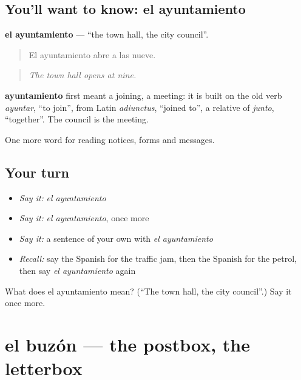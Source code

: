 \subsection*{You'll want to know: el ayuntamiento}
\textbf{el ayuntamiento} — \textquotedblleft{}the town hall, the city council\textquotedblright{}.

\begin{quote}
El ayuntamiento abre a las nueve.
\end{quote}

\begin{quote}
\emph{The town hall opens at nine.}
\end{quote}

\begin{cousinweb}
\textbf{ayuntamiento} first meant a joining, a meeting: it is built on the old verb \emph{ayuntar}, \textquotedblleft{}to join\textquotedblright{}, from Latin \emph{adiunctus}, \textquotedblleft{}joined to\textquotedblright{}, a relative of \emph{junto}, \textquotedblleft{}together\textquotedblright{}. The council is the meeting.
\end{cousinweb}

\begin{grammarlens}[title={What you've built}]
One more word for reading notices, forms and messages.
\end{grammarlens}

\subsection*{Your turn}
\begin{itemize}
\raggedright
  \item \emph{Say it:} \emph{el ayuntamiento}
  \item \emph{Say it:} \emph{el ayuntamiento}, once more
  \item \emph{Say it:} a sentence of your own with \emph{el ayuntamiento}
  \item \emph{Recall:} say the Spanish for the traffic jam, then the Spanish for the petrol, then say \emph{el ayuntamiento} again
\end{itemize}

\begin{tcolorbox}[breakable,colback=teal!4,colframe=teal!35!black,title={Before you move on}]
What does el ayuntamiento mean? (\textquotedblleft{}The town hall, the city council\textquotedblright{}.) Say it once more.
\end{tcolorbox}
\section[el buzón]{el buzón — the postbox, the letterbox}

